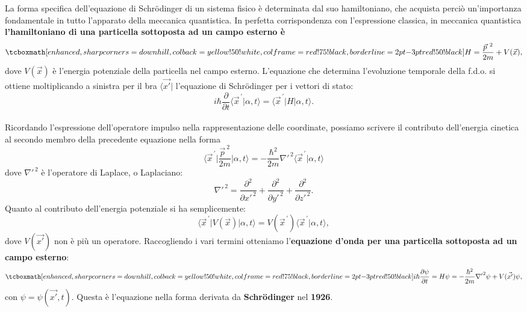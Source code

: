 La forma specifica dell'equazione di Schr\"{o}dinger di un sistema fisico è determinata dal suo hamiltoniano, che acquista perciò un'importanza fondamentale in tutto l'apparato della meccanica quantistica. In perfetta corrispondenza con l'espressione classica, in meccanica quantistica \textbf{l'hamiltoniano di una particella sottoposta ad un campo esterno è}
	\begin{equation}
		\tcboxmath[enhanced, sharp corners=downhill, colback=yellow!50!white, colframe=red!75!black, borderline={2pt}{-3pt}{red!50!black}]{
			H= \frac{\vec{p}^{\ 2}}{2m}+V(\vec{x}),
			}
	\label{eq:cap8_5}
	\end{equation}
dove $V(\vec{x})$ è l'energia potenziale della particella nel campo esterno.		
L'equazione che determina l'evoluzione temporale della f.d.o. si ottiene moltiplicando a sinistra per il bra $\langle \vec{x'}\vert $ l'equazione di Schr\"{o}dinger per i vettori di stato:
	\begin{equation}
		i\hbar \frac{\partial}{\partial t} \langle {\vec{x}}^{\, \prime}\vert \alpha , t \rangle = \langle {\vec{x}}^{\, \prime}\vert H \vert \alpha , t \rangle.
	\end{equation}\\
	
Ricordando l'espressione dell'operatore impulso nella rappresentazione delle coordinate, possiamo scrivere il contributo dell'energia cinetica al secondo membro della precedente equazione nella forma
	\begin{equation}
		\langle {\vec{x}}^{\, \prime}\vert \frac{\vec{p}^{\ 2}}{2m} \vert \alpha , t \rangle = -\frac{\hbar^2}{2m}{{\nabla}'}^{\, 2}\langle {\vec{x}}^{\, \prime}\vert \alpha , t \rangle
\end{equation}
dove ${{\nabla}'}^{\, 2}$ è l'operatore di Laplace, o Laplaciano:
\begin{equation}
{{\nabla}'}^{\, 2}= \frac{\partial ^2}{\partial {x'} ^{\, 2}}+\frac{\partial ^2}{\partial {y'} ^{\, 2}}+\frac{\partial ^2}{\partial {z'} ^{\, 2}}.
\end{equation}
Quanto al contributo dell'energia potenziale si ha semplicemente:
	\begin{equation}
		\langle {\vec{x}}^{\, \prime}\vert V(\vec{x}) \vert \alpha , t \rangle = V({\vec{x}}^{\, \prime})\langle {\vec{x}}^{\, \prime}  \vert \alpha , t \rangle ,
	\end{equation}
dove $V(\vec{x'})$ non è più un operatore. Raccogliendo i vari termini otteniamo l'\textbf{equazione d'onda per una particella sottoposta ad un campo esterno}:
	\begin{equation}
		\tcboxmath[enhanced, sharp corners=downhill, colback=yellow!50!white, colframe=red!75!black, borderline={2pt}{-3pt}{red!50!black}]{
			i\hbar \frac{\partial \psi}{\partial t} = H\psi = -\frac{\hbar ^2}{2m}{\nabla '} ^2 \psi + V(\vec{x'}) \psi,
			}
\end{equation}
con $\psi =\psi(\vec{x'}, t)$. Questa è l'equazione nella forma derivata da \textbf{Schr\"{o}dinger} nel \textbf{1926}.\\

